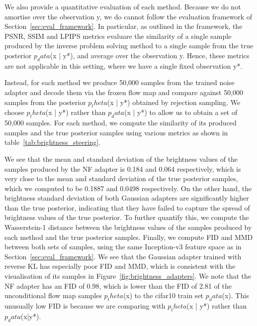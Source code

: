 \documentclass[12pt,a4paper]{report}
\begin{document}
We also provide a quantitative evaluation of each method. Because we do not amortise over the observation y, we do cannot follow the evaluation framework of Section~\ref{sec:eval_framework}. In particular, as outlined in the framework, the PSNR, SSIM and LPIPS metrics evaluare the similarity of a single sample produced by the inverse problem solving method to a single sample from the true posterior $p_data$(x | y*), and average over the observation y. Hence, these metrics are not applicable in this setting, where we have a single fixed observation y*.

Instead, for each method we produce 50,000 samples from the trained noise adapter and decode them via the frozen flow map and compare against 50,000 samples from the posterior $p_theta$(x | y*) obtained by rejection sampling. We choose $p_theta$(x | y*) rather than $p_data$(x | y*) to allow us to obtain a set of 50,000 samples. 
For each method, we compute the similarity of its produced samples and the true posterior samples using various metrics as shown in table~\ref{tab:brightness_steering}.

We see that the mean and standard deviation of the brightness values of the samples produced by the NF adapter is 0.184 and 0.064 respectively, which is very close to the mean and standard deviation of the true posterior samples, which we computed to be 0.1887 and 0.0498 respectively. 
On the other hand, the brightness standard deviation of both Gaussian adapters are significantly higher than the true posterior, indicating that they have failed to capture the spread of brightness values of the true posterior.
To further quantify this, we compute the Wasserstein-1 distance between the brightness values of the samples produced by each method and the true posterior samples. 
Finally, we compute FID and MMD between both sets of samples, using the same Inception-v3 feature space as in Section~\ref{sec:eval_framework}.
We see that the Gaussian adapter trained with reverse KL has especially poor FID and MMD, which is consistent with the visualisation of its samples in Figure~\ref{fig:brightness_adapters}. 
We note that the NF adapter has an FID of 0.98, which is lower than the FID of 2.81 of the unconditional flow map samples $p_theta$(x) to the cifar10 train set $p_data$(x). 
This unusually low FID is because we are comparing with $p_theta$(x | y*) rather than $p_data$(x|y*).
\end{document}
